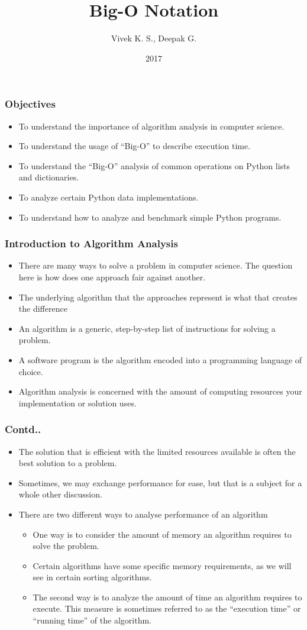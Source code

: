 \documentclass{beamer}
\title{Big-O Notation}
\author{Vivek K. S., Deepak G.}
\institute{Information Systems Decision Sciences (ISDS)\\
MUMA College of Business\\
University of South Florida \\
Tampa, Florida}
\date{2017}
\begin{document}
 
\frame{\titlepage}
 
\begin{frame}
\frametitle{Objectives}
\begin{itemize}
\item To understand the importance of algorithm analysis in computer science.
\item To understand the usage of “Big-O” to describe execution time.
\item To understand the “Big-O” analysis of common operations on Python lists and
dictionaries.
\item To analyze certain Python data implementations.
\item To understand how to analyze and benchmark simple Python programs.

\end{itemize}
\end{frame}

\begin{frame}
\frametitle{Introduction to Algorithm Analysis}
\begin{itemize}
\item There are many ways to solve a problem in computer science. The question here is how does one approach fair against another.
\item The underlying algorithm that the approaches represent is what that creates the difference
\item An algorithm is a generic, step-by-step list of instructions for solving a problem.
\item A software program is the algorithm encoded into a programming language of choice. 
\item Algorithm analysis is concerned with the amount of computing resources your implementation or solution uses.
\end{itemize}
\end{frame}


\begin{frame}
\frametitle{Contd..}
\begin{itemize}
\item The solution that is efficient with the limited resources available is often the best solution to a problem.
\item Sometimes, we may exchange performance for ease, but that is a subject for a whole other discussion.
\item There are two different ways to analyse performance of an algorithm
\begin{itemize}
\item One way is to consider the amount of memory an algorithm requires to solve the problem. 
\item Certain algorithms have some specific memory requirements, as we will see in certain sorting algorithms.
\item The second way is to analyze the amount of time an algorithm requires to execute. This measure is sometimes referred to as the “execution time” or “running time” of the algorithm.
\end{itemize}
\end{itemize}
\end{frame}
\end{document}
